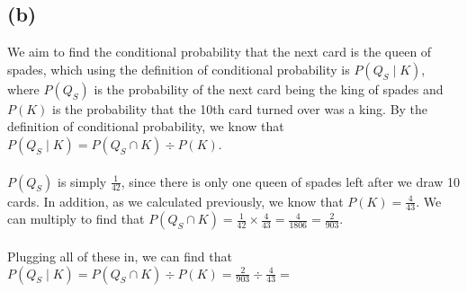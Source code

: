 \documentclass{article}
\begin{document}
{\subsection*{(b)}
We aim to find the conditional probability that the next card is the queen of spades, which using the definition of conditional probability is $P(Q_S \mid K)$, where $P(Q_S)$ is the probability of the next card being the king of spades and $P(K)$ is the probability that the 10th card turned over was a king. By the definition of conditional probability, we know that $P(Q_S \mid K) = P(Q_S \cap K) \div P(K)$. \\ \\ 
$P(Q_S)$ is simply $\frac{1}{42}$, since there is only one queen of spades left after we draw 10 cards. In addition, as we calculated previously, we know that $P(K) = \frac{4}{43}$. We can multiply to find that $P(Q_S \cap K) = \frac{1}{42} \times \frac{4}{43} = \frac{4}{1806} = \frac{2}{903}$. \\ \\
Plugging all of these in, we can find that $P(Q_S \mid K) = P(Q_S \cap K) \div P(K) = \frac{2}{903} \div \frac{4}{43} = $ 

}
\end{document}
